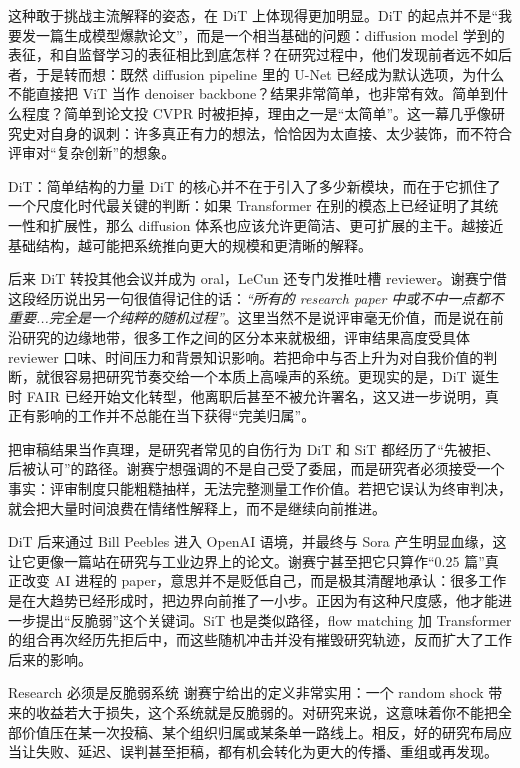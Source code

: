 \documentclass[a4paper,12pt]{article}
\begin{document}
这种敢于挑战主流解释的姿态，在 DiT 上体现得更加明显。DiT 的起点并不是“我要发一篇生成模型爆款论文”，而是一个相当基础的问题：diffusion model 学到的表征，和自监督学习的表征相比到底怎样？在研究过程中，他们发现前者远不如后者，于是转而想：既然 diffusion pipeline 里的 U-Net 已经成为默认选项，为什么不能直接把 ViT 当作 denoiser backbone？结果非常简单，也非常有效。简单到什么程度？简单到论文投 CVPR 时被拒掉，理由之一是“太简单”。这一幕几乎像研究史对自身的讽刺：许多真正有力的想法，恰恰因为太直接、太少装饰，而不符合评审对“复杂创新”的想象。

\begin{importantbox}{DiT：简单结构的力量}
DiT 的核心并不在于引入了多少新模块，而在于它抓住了一个尺度化时代最关键的判断：如果 Transformer 在别的模态上已经证明了其统一性和扩展性，那么 diffusion 体系也应该允许更简洁、更可扩展的主干。越接近基础结构，越可能把系统推向更大的规模和更清晰的解释。
\end{importantbox}

后来 DiT 转投其他会议并成为 oral，LeCun 还专门发推吐槽 reviewer。谢赛宁借这段经历说出另一句很值得记住的话：\textit{``所有的 research paper 中或不中一点都不重要...完全是一个纯粹的随机过程''}。这里当然不是说评审毫无价值，而是说在前沿研究的边缘地带，很多工作之间的区分本来就极细，评审结果高度受具体 reviewer 口味、时间压力和背景知识影响。若把命中与否上升为对自我价值的判断，就很容易把研究节奏交给一个本质上高噪声的系统。更现实的是，DiT 诞生时 FAIR 已经开始文化转型，他离职后甚至不被允许署名，这又进一步说明，真正有影响的工作并不总能在当下获得“完美归属”。

\begin{warningbox}{把审稿结果当作真理，是研究者常见的自伤行为}
DiT 和 SiT 都经历了“先被拒、后被认可”的路径。谢赛宁想强调的不是自己受了委屈，而是研究者必须接受一个事实：评审制度只能粗糙抽样，无法完整测量工作价值。若把它误认为终审判决，就会把大量时间浪费在情绪性解释上，而不是继续向前推进。
\end{warningbox}

DiT 后来通过 Bill Peebles 进入 OpenAI 语境，并最终与 Sora 产生明显血缘，这让它更像一篇站在研究与工业边界上的论文。谢赛宁甚至把它只算作“0.25 篇”真正改变 AI 进程的 paper，意思并不是贬低自己，而是极其清醒地承认：很多工作是在大趋势已经形成时，把边界向前推了一小步。正因为有这种尺度感，他才能进一步提出“反脆弱”这个关键词。SiT 也是类似路径，flow matching 加 Transformer 的组合再次经历先拒后中，而这些随机冲击并没有摧毁研究轨迹，反而扩大了工作后来的影响。

\begin{importantbox}{Research 必须是反脆弱系统}
谢赛宁给出的定义非常实用：一个 random shock 带来的收益若大于损失，这个系统就是反脆弱的。对研究来说，这意味着你不能把全部价值压在某一次投稿、某个组织归属或某条单一路线上。相反，好的研究布局应当让失败、延迟、误判甚至拒稿，都有机会转化为更大的传播、重组或再发现。
\end{importantbox}
\end{document}

